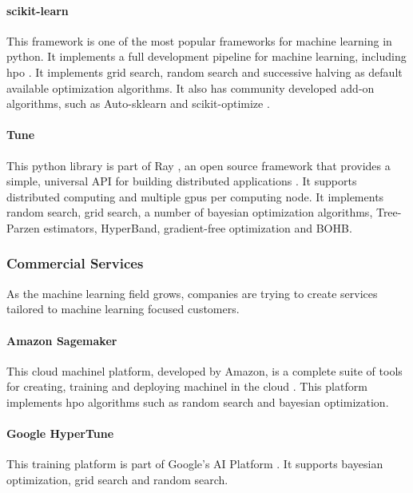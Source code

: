 \paragraph{scikit-learn} This framework is one of the most popular frameworks for machine learning in \acrshort{python}. It implements a full development pipeline for machine learning, including \acrshort{hpo} \parencite{scikit-learn}. It implements grid search, random search and successive halving as default available optimization algorithms. It also has community developed add-on algorithms, such as Auto-sklearn \parencite{auto-sklearn} and scikit-optimize \parencite{scikit-optimize}.

\paragraph{Tune} This \acrshort{python} library is part of Ray \parencite{ray}, an open source framework that provides a simple, universal API for building distributed applications \parencite{liaw2018tune}. It supports distributed computing and multiple \acrshort{gpu}s per computing node. It implements random search, grid search, a number of bayesian optimization algorithms, Tree-Parzen estimators, HyperBand, gradient-free optimization and BOHB.

\subsubsection{Commercial Services} 

As the machine learning field grows, companies are trying to create services tailored to machine learning focused customers.

\paragraph{Amazon Sagemaker} This cloud \acrshort{machinel} platform, developed by Amazon, is a complete suite of tools for creating, training and deploying \acrshort{machinel} in the cloud \parencite{sagemaker}. This platform implements \acrshort{hpo} algorithms such as random search and bayesian optimization.

\paragraph{Google HyperTune} This training platform is part of Google's AI Platform \parencite{ghypertune}. It supports bayesian optimization, grid search and random search.   